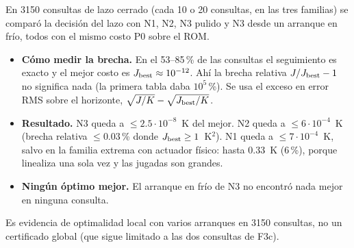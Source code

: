 En 3150 consultas de lazo cerrado (cada 10 o 20 consultas, en las tres familias) se comparó la
decisión del lazo con N1, N2, N3 pulido y N3 desde un arranque en frío, todos con el mismo
costo P0 sobre el ROM.
\begin{itemize}
  \item \textbf{Cómo medir la brecha.} En el 53--85\,\% de las consultas el seguimiento es
        exacto y el mejor costo es $J_{\rm best}\approx10^{-12}$. Ahí la brecha relativa
        $J/J_{\rm best}-1$ no significa nada (la primera tabla daba $10^5$\,\%). Se usa el exceso
        en error RMS sobre el horizonte, $\sqrt{J/K}-\sqrt{J_{\rm best}/K}$.
  \item \textbf{Resultado.} N3 queda a $\le2.5\cdot10^{-8}$~K del mejor. N2 queda a
        $\le6\cdot10^{-4}$~K (brecha relativa $\le0.03$\,\% donde $J_{\rm best}\ge1$~K$^2$).
        N1 queda a $\le7\cdot10^{-4}$~K, salvo en la familia extrema con actuador físico: hasta
        0.33~K (6\,\%), porque linealiza una sola vez y las jugadas son grandes.
  \item \textbf{Ningún óptimo mejor.} El arranque en frío de N3 no encontró nada mejor en
        ninguna consulta.
\end{itemize}
Es evidencia de optimalidad local con varios arranques en 3150 consultas, no un certificado
global (que sigue limitado a las dos consultas de F3c).

